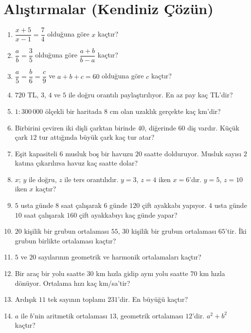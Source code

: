 \kendinizoncesi
\section{Alıştırmalar (Kendiniz Çözün)}

\begin{enumerate}[label=\textbf{\arabic*.},leftmargin=*,itemsep=2pt]
\item \(\dfrac{x+5}{x-1}=\dfrac{7}{4}\) olduğuna göre \(x\) kaçtır?
\item \(\dfrac{a}{b}=\dfrac{3}{5}\) olduğuna göre \(\dfrac{a+b}{b-a}\) kaçtır?
\item \(\dfrac{a}{5}=\dfrac{b}{6}=\dfrac{c}{9}\) ve \(a+b+c=60\) olduğuna göre \(c\) kaçtır?
\item \(720\) TL, \(3\), \(4\) ve \(5\) ile doğru orantılı paylaştırılıyor. En az pay kaç TL'dir?
\item \(1:300\,000\) ölçekli bir haritada \(8\) cm olan uzaklık gerçekte kaç km'dir?
\item Birbirini çeviren iki dişli çarktan birinde \(40\), diğerinde \(60\) diş vardır. Küçük çark \(12\) tur attığında büyük çark kaç tur atar?
\item Eşit kapasiteli \(6\) musluk boş bir havuzu \(20\) saatte dolduruyor. Musluk sayısı \(2\) katına çıkarılırsa havuz kaç saatte dolar?
\item \(x\); \(y\) ile doğru, \(z\) ile ters orantılıdır. \(y=3\), \(z=4\) iken \(x=6\)'dır. \(y=5\), \(z=10\) iken \(x\) kaçtır?
\item \(5\) usta günde \(8\) saat çalışarak \(6\) günde \(120\) çift ayakkabı yapıyor. \(4\) usta günde \(10\) saat çalışarak \(160\) çift ayakkabıyı kaç günde yapar?
\item \(20\) kişilik bir grubun ortalaması \(55\), \(30\) kişilik bir grubun ortalaması \(65\)'tir. İki grubun birlikte ortalaması kaçtır?
\item \(5\) ve \(20\) sayılarının geometrik ve harmonik ortalamaları kaçtır?
\item Bir araç bir yolu saatte \(30\) km hızla gidip aynı yolu saatte \(70\) km hızla dönüyor. Ortalama hızı kaç km/sa'tir?
\item Ardışık \(11\) tek sayının toplamı \(231\)'dir. En büyüğü kaçtır?
\item \(a\) ile \(b\)'nin aritmetik ortalaması \(13\), geometrik ortalaması \(12\)'dir. \(a^2+b^2\) kaçtır?
\end{enumerate}

